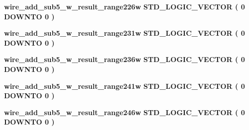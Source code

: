 \begin{DoxyCompactItemize}
\item 
{\bf wire\+\_\+add\+\_\+sub5\+\_\+w\+\_\+result\+\_\+range226w} {\bfseries \textcolor{comment}{S\+T\+D\+\_\+\+L\+O\+G\+I\+C\+\_\+\+V\+E\+C\+T\+OR}\textcolor{vhdlchar}{ }\textcolor{vhdlchar}{(}\textcolor{vhdlchar}{ }\textcolor{vhdlchar}{ } \textcolor{vhdldigit}{0} \textcolor{vhdlchar}{ }\textcolor{keywordflow}{D\+O\+W\+N\+TO}\textcolor{vhdlchar}{ }\textcolor{vhdlchar}{ } \textcolor{vhdldigit}{0} \textcolor{vhdlchar}{ }\textcolor{vhdlchar}{)}\textcolor{vhdlchar}{ }} 
\item 
{\bf wire\+\_\+add\+\_\+sub5\+\_\+w\+\_\+result\+\_\+range231w} {\bfseries \textcolor{comment}{S\+T\+D\+\_\+\+L\+O\+G\+I\+C\+\_\+\+V\+E\+C\+T\+OR}\textcolor{vhdlchar}{ }\textcolor{vhdlchar}{(}\textcolor{vhdlchar}{ }\textcolor{vhdlchar}{ } \textcolor{vhdldigit}{0} \textcolor{vhdlchar}{ }\textcolor{keywordflow}{D\+O\+W\+N\+TO}\textcolor{vhdlchar}{ }\textcolor{vhdlchar}{ } \textcolor{vhdldigit}{0} \textcolor{vhdlchar}{ }\textcolor{vhdlchar}{)}\textcolor{vhdlchar}{ }} 
\item 
{\bf wire\+\_\+add\+\_\+sub5\+\_\+w\+\_\+result\+\_\+range236w} {\bfseries \textcolor{comment}{S\+T\+D\+\_\+\+L\+O\+G\+I\+C\+\_\+\+V\+E\+C\+T\+OR}\textcolor{vhdlchar}{ }\textcolor{vhdlchar}{(}\textcolor{vhdlchar}{ }\textcolor{vhdlchar}{ } \textcolor{vhdldigit}{0} \textcolor{vhdlchar}{ }\textcolor{keywordflow}{D\+O\+W\+N\+TO}\textcolor{vhdlchar}{ }\textcolor{vhdlchar}{ } \textcolor{vhdldigit}{0} \textcolor{vhdlchar}{ }\textcolor{vhdlchar}{)}\textcolor{vhdlchar}{ }} 
\item 
{\bf wire\+\_\+add\+\_\+sub5\+\_\+w\+\_\+result\+\_\+range241w} {\bfseries \textcolor{comment}{S\+T\+D\+\_\+\+L\+O\+G\+I\+C\+\_\+\+V\+E\+C\+T\+OR}\textcolor{vhdlchar}{ }\textcolor{vhdlchar}{(}\textcolor{vhdlchar}{ }\textcolor{vhdlchar}{ } \textcolor{vhdldigit}{0} \textcolor{vhdlchar}{ }\textcolor{keywordflow}{D\+O\+W\+N\+TO}\textcolor{vhdlchar}{ }\textcolor{vhdlchar}{ } \textcolor{vhdldigit}{0} \textcolor{vhdlchar}{ }\textcolor{vhdlchar}{)}\textcolor{vhdlchar}{ }} 
\item 
{\bf wire\+\_\+add\+\_\+sub5\+\_\+w\+\_\+result\+\_\+range246w} {\bfseries \textcolor{comment}{S\+T\+D\+\_\+\+L\+O\+G\+I\+C\+\_\+\+V\+E\+C\+T\+OR}\textcolor{vhdlchar}{ }\textcolor{vhdlchar}{(}\textcolor{vhdlchar}{ }\textcolor{vhdlchar}{ } \textcolor{vhdldigit}{0} \textcolor{vhdlchar}{ }\textcolor{keywordflow}{D\+O\+W\+N\+TO}\textcolor{vhdlchar}{ }\textcolor{vhdlchar}{ } \textcolor{vhdldigit}{0} \textcolor{vhdlchar}{ }\textcolor{vhdlchar}{)}\textcolor{vhdlchar}{ }} 
\item 

\end{DoxyCompactItemize}
